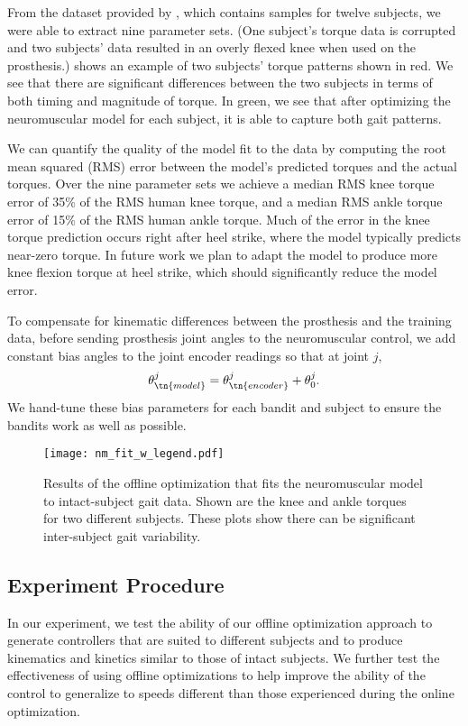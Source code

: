 From the dataset provided by \citet{moore2015elaborate}, which contains samples
for twelve subjects, we were able to extract nine parameter sets. (One subject's
torque data is corrupted and two subjects' data resulted in an overly flexed
knee when used on the prosthesis.)  shows an example of two
subjects' torque patterns shown in red. We see that there are significant
differences between the two subjects in terms of both timing and magnitude of
torque. In green, we see that after optimizing the neuromuscular model for each
subject, it is able to capture both gait patterns. 

We can quantify the quality of the model fit to the data by computing the root
mean squared (RMS) error between the model's predicted torques and the actual
torques. Over the nine parameter sets we achieve a median RMS knee torque error
of 35\% of the RMS human knee torque, and a median RMS ankle torque error of
15\% of the RMS human ankle torque. Much of the error in the knee torque
prediction occurs right after heel strike, where the model typically predicts
near-zero torque. In future work we plan to adapt the model to produce more knee
flexion torque at heel strike, which should significantly reduce the model
error.

To compensate for kinematic differences between the prosthesis and the training
data, before sending prosthesis joint angles to the neuromuscular control, we
add constant bias angles to the joint encoder readings so that at joint $j$,
\begin{align}
    \theta_\tn{model}^j = \theta_\tn{encoder}^j + \theta_0^j.
    \label{eq:bias_param}
\end{align}
We hand-tune these bias parameters for each bandit and subject to ensure the
bandits work as well as possible.
 
\begin{figure}[htb]
    \centering 
    \texttt{[image: nm\_fit\_w\_legend.pdf]}
    \caption[Results of offline optimization to fits neuromuscular model to
    intact-subject gait data at different speeds]{Results of the offline
    optimization that fits the neuromuscular model to intact-subject gait data.
    Shown are the knee and ankle torques for two different subjects.  These
    plots show there can be significant inter-subject gait
    variability.}\label{fig:nm_fit}
\end{figure}

\subsection{Experiment Procedure}
In our experiment, we test the ability of our offline optimization approach to
generate controllers that are suited to different subjects and to produce
kinematics and kinetics similar to those of intact subjects. We further test the
effectiveness of using offline optimizations to help improve the ability of the
control to generalize to speeds different than those experienced during the
online optimization.


